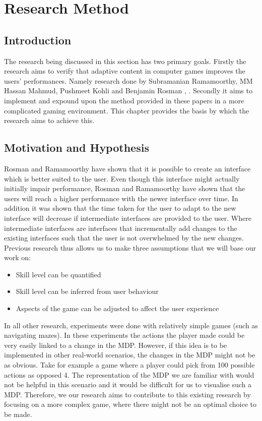 \documentclass[11pt]{article}
\begin{document}
\clearpage
\section{Research Method}
\subsection{Introduction}
The research being discussed in this section has two primary goals. Firstly the research aims to verify that adaptive content in computer games improves the users' performances. Namely research done by Subramanian Ramamoorthy, MM Hassan Mahmud, Pushmeet Kohli and Benjamin Rosman \citep{rosman2014user}, \citep{ramamoorthy2013latent}. Secondly it aims to implement and expound upon the method provided in these papers in a more complicated gaming environment. This chapter provides the basis by which the research aims to achieve this.
\vspace{6.0 mm}
\subsection{Motivation and Hypothesis}

Rosman and Ramamoorthy \citep{rosman2014user} have shown that it is possible to create an interface which is better suited to the user. Even though this interface might actually initially impair performance, Rosman and Ramamoorthy have shown that the users will reach a higher performance with the newer interface over time. In addition it was shown that the time taken for the user to adapt to the new interface will decrease if intermediate interfaces are provided to the user. Where intermediate interfaces are interfaces that incrementally add changes to the existing interfaces such that the user is not overwhelmed by the new changes. Previous research thus allows us to make three assumptions that we will base our work on:\\
\begin{itemize}
\item Skill level can be quantified
\item Skill level can be inferred from user behaviour
\item Aspects of the game can be adjusted to affect the user experience
\end{itemize}

\vspace{6.0 mm}

In all other research, experiments were done with relatively simple games (such as navigating mazes). In these experiments the actions the player made could be very easily linked to a change in the MDP. However, if this idea is to be implemented in other real-world scenarios, the changes in the MDP might not be as obvious. Take for example a game where a player could pick from 100 possible actions as opposed 4. The representation of the MDP we are familiar with would not be helpful in this scenario and it would be difficult for us to visualise such a MDP. Therefore, we our research aims to contribute to this existing research by focusing on a more complex game, where there might not be an optimal choice to be made.
\vspace{6.0 mm}
\end{document}
